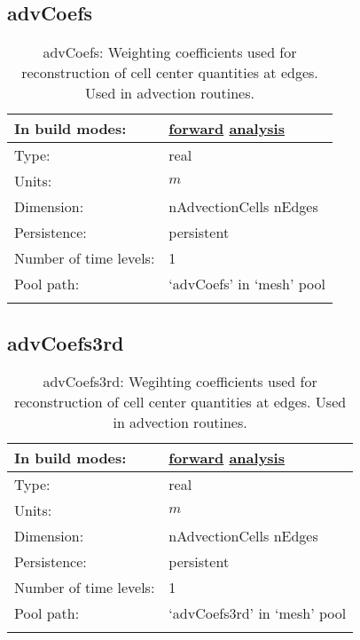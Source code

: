 \subsection[advCoefs]{advCoefs}
\label{subsec:var_sec_mesh_advCoefs}
\begin{center}
\begin{longtable}{| p{2.0in} | p{4.0in} |}
        \hline 
        In build modes: & \hyperref[subsec:forward_var_tab_mesh]{forward} \hyperref[subsec:analysis_var_tab_mesh]{analysis} \\
        \hline 
        Type: & real \\
        \hline 
        Units: & $m$ \\
        \hline 
        Dimension: & nAdvectionCells nEdges \\
        \hline 
        Persistence: & persistent \\
        \hline 
        Number of time levels: & 1 \\
        \hline 
            Pool path: & `advCoefs' in `mesh' pool \\
		 \hline 
    \caption{advCoefs: Weighting coefficients used for reconstruction of cell center quantities at edges. Used in advection routines.}
\end{longtable}
\end{center}
\subsection[advCoefs3rd]{advCoefs3rd}
\label{subsec:var_sec_mesh_advCoefs3rd}
\begin{center}
\begin{longtable}{| p{2.0in} | p{4.0in} |}
        \hline 
        In build modes: & \hyperref[subsec:forward_var_tab_mesh]{forward} \hyperref[subsec:analysis_var_tab_mesh]{analysis} \\
        \hline 
        Type: & real \\
        \hline 
        Units: & $m$ \\
        \hline 
        Dimension: & nAdvectionCells nEdges \\
        \hline 
        Persistence: & persistent \\
        \hline 
        Number of time levels: & 1 \\
        \hline 
            Pool path: & `advCoefs3rd' in `mesh' pool \\
		 \hline 
    \caption{advCoefs3rd: Wegihting coefficients used for reconstruction of cell center quantities at edges. Used in advection routines.}
\end{longtable}
\end{center}
